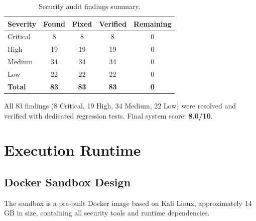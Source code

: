\documentclass[12pt,a4paper,twoside]{report}
\begin{document}
\begin{table}[H]
\centering
\caption{Security audit findings summary.}
\label{tab:audit}
\begin{tabular}{lcccc}
\toprule
\textbf{Severity} & \textbf{Found} & \textbf{Fixed} & \textbf{Verified} & \textbf{Remaining} \\
\midrule
\textcolor{phantomred}{Critical}       & 8  & 8  & 8  & 0 \\
\textcolor{phantomorange}{High}        & 19 & 19 & 19 & 0 \\
\textcolor{phantomyellow!80!black}{Medium}      & 34 & 34 & 34 & 0 \\
\textcolor{phantomgreen}{Low}          & 22 & 22 & 22 & 0 \\
\midrule
\textbf{Total}     & \textbf{83} & \textbf{83} & \textbf{83} & \textbf{0} \\
\bottomrule
\end{tabular}
\end{table}

\begin{successbox}
All 83 findings (8 Critical, 19 High, 34 Medium, 22 Low) were resolved and verified with dedicated regression tests. Final system score: \textbf{8.0/10}.
\end{successbox}


\chapter{Execution Runtime}
\label{ch:runtime}

\section{Docker Sandbox Design}

The sandbox is a pre-built Docker image based on Kali Linux, approximately 14\,GB in size, containing all security tools and runtime dependencies.
\end{document}
